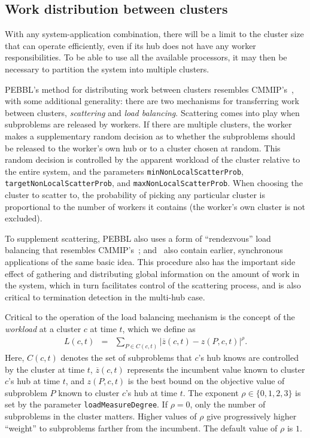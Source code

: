 \subsection{Work distribution between clusters}
\label{sec:betweenclusters}
With any system-application combination, there will be a limit to the
cluster size that can operate efficiently, even if its hub does
not have any worker responsibilities.  To be able to use
all the available processors, it may then be necessary to partition
the system into multiple clusters.

PEBBL's method for distributing work between clusters resembles
CMMIP's~\cite{Eck94,Eck97}, with some additional generality: there are
two mechanisms for transferring work between clusters,
\emph{scattering} and \emph{load balancing}.  Scattering comes into
play when subproblems are released by workers.  If there are multiple
clusters, the worker makes a supplementary random decision as to
whether the subproblems should be released to the worker's own hub or
to a cluster chosen at random.  This random decision is controlled by
the apparent workload of the cluster relative to the entire system,
and the parameters \texttt{minNonLocalScatterProb},
\texttt{targetNonLocalScatterProb}, and
\texttt{maxNonLocalScatterProb}.  When choosing the cluster to scatter
to, the probability of picking any particular cluster is proportional
to the number of workers it contains (the worker's own cluster is
not excluded).

To supplement scattering, PEBBL also uses a form of ``rendezvous''
load balancing that resembles CMMIP's~\cite{Eck97};
\cite{MD93} and~\cite{KK92} also contain earlier, synchronous
applications of the same basic idea.  This procedure also has the
important side effect of gathering and distributing global information
on the amount of work in the system, which in turn facilitates control
of the scattering process, and is also critical to termination
detection in the multi-hub case.

Critical to the operation of the load balancing mechanism is the
concept of the \emph{workload} at a cluster $c$ at time $t$, which we
define as
\begin{eqnarray}
L(c,t) & = &\sum_{P \in C(c,t)} \!\!\!
{ \left| \overline{z}(c,t) - z(P,c,t) \right| }^{\rho}.
\label{loadcalc}
\end{eqnarray}
Here, $C(c,t)$ denotes the set of subproblems that $c$'s hub knows are
controlled by the cluster at time $t$, $\overline{z}(c,t)$ represents the
incumbent value known to cluster $c$'s hub at time $t$, and $z(P,c,t)$
is the best bound on the objective value of subproblem $P$ known to cluster
$c$'s hub at time $t$.  The exponent $\rho \in \{0, 1, 2, 3\}$
is set by the parameter \texttt{loadMeasureDegree}.  If $\rho=0$,
only the number of subproblems in the cluster matters.  Higher values of
$\rho$ give progressively higher ``weight'' to subproblems
farther from the incumbent.  The default value of $\rho$ is $1$.


